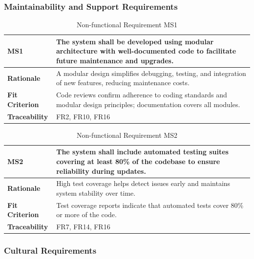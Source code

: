 \documentclass[12pt]{article}
\begin{document}
\subsubsection{Maintainability and Support Requirements}

\begin{table}[h!]
\centering
{}
\begin{tabular}{|p{3.5cm}|p{11.5cm}|}
\hline
\rowcolor{gray!30}
\textbf{MS1} & The system shall be developed using modular architecture with well-documented code to facilitate future maintenance and upgrades. \\
\hline
\textbf{Rationale} & A modular design simplifies debugging, testing, and integration of new features, reducing maintenance costs. \\
\hline
\textbf{Fit Criterion} & Code reviews confirm adherence to coding standards and modular design principles; documentation covers all modules. \\
\hline
\textbf{Traceability} & FR2, FR10, FR16 \\
\hline
\end{tabular}
\caption{Non-functional Requirement MS1}
\end{table}

\begin{table}[h!]
\centering
{}
\begin{tabular}{|p{3.5cm}|p{11.5cm}|}
\hline
\rowcolor{gray!30}
\textbf{MS2} & The system shall include automated testing suites covering at least 80\% of the codebase to ensure reliability during updates. \\
\hline
\textbf{Rationale} & High test coverage helps detect issues early and maintains system stability over time. \\
\hline
\textbf{Fit Criterion} & Test coverage reports indicate that automated tests cover 80\% or more of the code. \\
\hline
\textbf{Traceability} & FR7, FR14, FR16\\
\hline
\end{tabular}
\caption{Non-functional Requirement MS2}
\end{table}
\newpage
\subsubsection{Cultural Requirements}
\end{document}
